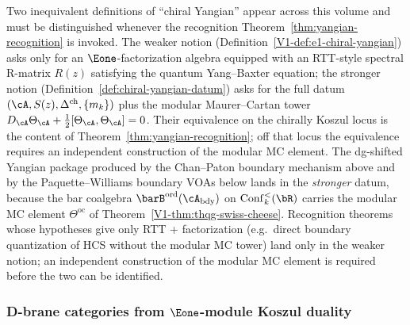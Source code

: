 \begin{remark}
\label{rem:ht-yangian-two-definitions}
Two inequivalent definitions of ``chiral Yangian'' appear across
this volume and must be distinguished whenever the recognition
Theorem~\ref{thm:yangian-recognition} is invoked. The weaker
notion (Definition~\ref{V1-def:e1-chiral-yangian}) asks only for an
$\Eone$-factorization algebra equipped with an RTT-style spectral
R-matrix $R(z)$ satisfying the quantum Yang--Baxter equation; the
stronger notion (Definition~\ref{def:chiral-yangian-datum}) asks
for the full datum $(\cA, S(z), \Delta^{\mathrm{ch}}, \{m_k\})$
plus the modular Maurer--Cartan tower
$D_\cA \Theta_\cA + \tfrac{1}{2}[\Theta_\cA,\Theta_\cA]=0$.
Their equivalence on the chirally Koszul locus is the content
of Theorem~\ref{thm:yangian-recognition}; off that locus the
equivalence requires an independent construction of the modular MC
element.
The dg-shifted Yangian package produced by the Chan--Paton
boundary mechanism above and by the Paquette--Williams boundary
VOAs below lands in the \emph{stronger} datum, because the bar
coalgebra $\barB^{\mathrm{ord}}(\cA_{\mathrm{bdy}})$ on
$\Conf_k^<(\bR)$ carries the modular MC element $\Theta^{\mathrm{oc}}$
of Theorem~\ref*{V1-thm:thqg-swiss-cheese}. Recognition theorems
whose hypotheses give only RTT + factorization (e.g.\ direct
boundary quantization of HCS without the modular MC tower) land
only in the weaker notion; an independent construction of the
modular MC element is required before the two can be identified.
\end{remark}

\subsubsection{\texorpdfstring{D-brane categories from $\Eone$-module Koszul duality}{D-brane categories from E1-module Koszul duality}}

